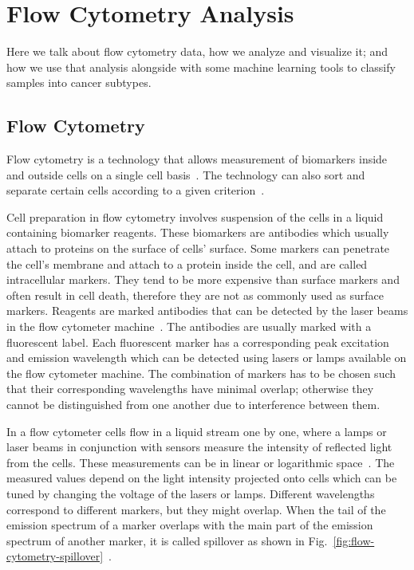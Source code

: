 \chapter{Flow Cytometry Analysis}
\label{sec:fcs}

Here we talk about flow cytometry data, how we analyze and visualize it; and how we use that analysis alongside with some machine learning tools to classify samples into cancer subtypes.

\section{Flow Cytometry}
Flow cytometry is a technology that allows measurement of biomarkers inside and outside cells on a single cell basis~\cite{jaroszeski1999fundamentals}. The technology can also sort and separate certain cells according to a given criterion~\cite{flow-cytometry-sorting, jaroszeski1999fundamentals}.

Cell preparation in flow cytometry involves suspension of the cells in a liquid containing biomarker reagents. These biomarkers are antibodies which usually attach to proteins on the surface of cells' surface. Some markers can penetrate the cell's membrane and attach to a protein inside the cell, and are called intracellular markers. They tend to be more expensive than surface markers and often result in cell death, therefore they are not as commonly used as surface markers. Reagents are marked antibodies that can be detected by the laser beams in the flow cytometer machine~\cite{practical-flow-cytometry-book}. The antibodies are usually marked with a fluorescent label. Each fluorescent marker has a corresponding peak excitation and emission wavelength which can be detected using lasers or lamps available on the flow cytometer machine. The combination of markers has to be chosen such that their corresponding wavelengths have minimal overlap; otherwise they cannot be distinguished from one another due to interference between them.

In a flow cytometer cells flow in a liquid stream one by one, where a lamps or laser beams in conjunction with sensors measure the intensity of reflected light from the cells. These measurements can be in linear or logarithmic space~\cite{practical-flow-cytometry-book}. The measured values depend on the light intensity projected onto cells which can be tuned by changing the voltage of the lasers or lamps. Different wavelengths correspond to different markers, but they might overlap. When the tail of the emission spectrum of a marker overlaps with the main part of the emission spectrum of another marker, it is called spillover as shown in Fig.~\ref{fig:flow-cytometry-spillover}~\cite{flow-cytometry-compensation}.

